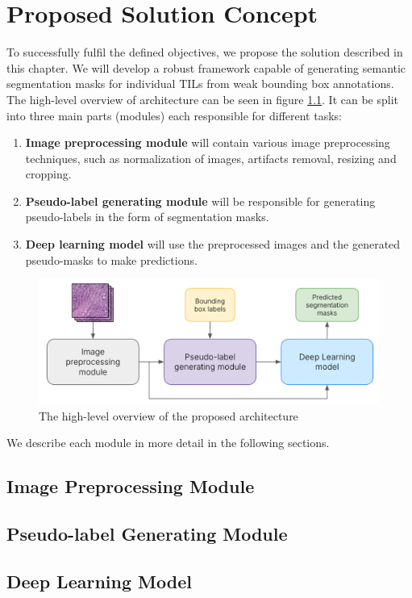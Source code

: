 \chapter{Proposed Solution Concept}
\label{chap:solution-concept}

To successfully fulfil the defined objectives, we propose the solution described in this chapter. We will develop a robust framework capable of generating semantic segmentation masks for individual TILs from weak bounding box annotations. The high-level overview of architecture can be seen in figure \ref{fig:sc-main}. It can be split into three main parts (modules) each responsible for different tasks:

\begin{enumerate}
    \item \textbf{Image preprocessing module} will contain various image preprocessing techniques, such as normalization of images, artifacts removal, resizing and cropping.
    \item \textbf{Pseudo-label generating module} will be responsible for generating pseudo-labels in the form of segmentation masks.
    \item \textbf{Deep learning model} will use the preprocessed images and the generated pseudo-masks to make predictions.
\end{enumerate}

\begin{figure}[H]
    \begin{centering}
    \includegraphics[width=14cm]{assets/images/sc-main.png}
    \par\end{centering}
    \caption{The high-level overview of the proposed architecture}
    \label{fig:sc-main}
\end{figure}

We describe each module in more detail in the following sections.

\section{Image Preprocessing Module}
\section{Pseudo-label Generating Module}
\section{Deep Learning Model}

